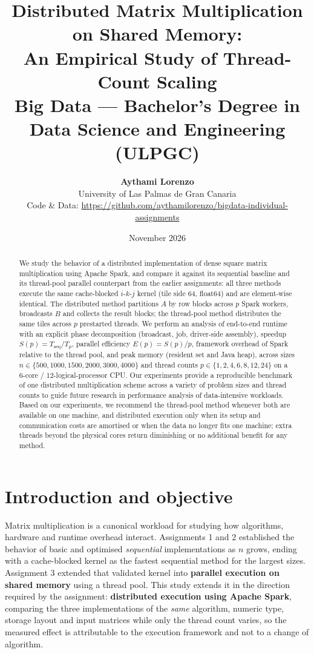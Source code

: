 \documentclass[11pt,a4paper]{article}
\title{\textbf{Distributed Matrix Multiplication on Shared Memory:\\
An Empirical Study of Thread-Count Scaling}\\
\vspace{0.2cm}
\Large Big Data --- Bachelor's Degree in Data Science and Engineering (ULPGC)}
\author{\textbf{Aythami Lorenzo} \\[0.1cm]
\small University of Las Palmas de Gran Canaria \\
\small Code \& Data: \url{https://github.com/aythamilorenzo/bigdata-individual-assignments}}
\date{November 2026}
\begin{document}
\maketitle

\begin{abstract}
{\small
We study the behavior of a distributed implementation of dense square matrix
multiplication using Apache Spark, and compare it against its sequential
baseline and its thread-pool parallel counterpart from the earlier
assignments: all three methods execute the same cache-blocked $i$-$k$-$j$
kernel (tile side 64, float64) and are element-wise identical. The
distributed method partitions $A$ by row blocks across $p$ Spark workers,
broadcasts $B$ and collects the result blocks; the thread-pool method
distributes the same tiles across $p$ prestarted threads. We perform an
analysis of end-to-end runtime with an explicit phase decomposition
(broadcast, job, driver-side assembly), speedup $S(p) = T_{\mathrm{seq}}/T_p$,
parallel efficiency $E(p) = S(p)/p$, framework overhead of Spark relative to
the thread pool, and peak memory (resident set and Java heap), across sizes
$n \in \{500, 1000, 1500, 2000, 3000, 4000\}$ and thread counts
$p \in \{1, 2, 4, 6, 8, 12, 24\}$ on a 6-core / 12-logical-processor CPU.
Our experiments provide a reproducible benchmark of one distributed
multiplication scheme across a variety of problem sizes and thread counts to
guide future research in performance analysis of data-intensive workloads.
Based on our experiments, we recommend the thread-pool method whenever both
are available on one machine, and distributed execution only when its
setup and communication costs are amortised or when the data no longer fits
one machine; extra threads beyond the physical cores return diminishing or
no additional benefit for any method.
}
\end{abstract}

\setcounter{tocdepth}{1}
{\small\tableofcontents}
\newpage

\section{Introduction and objective}
\label{sec:introduction}

Matrix multiplication is a canonical workload for studying how algorithms,
hardware and runtime overhead interact. Assignments 1 and 2 established the
behavior of basic and optimised \emph{sequential} implementations as $n$
grows, ending with a cache-blocked kernel as the fastest sequential method
for the largest sizes. Assignment 3 extended that validated kernel into
\textbf{parallel execution on shared memory} using a thread pool. This study
extends it in the direction required by the assignment:
\textbf{distributed execution using Apache Spark}, comparing the three
implementations of the \emph{same} algorithm, numeric type, storage layout
and input matrices while only the thread count varies, so the measured
effect is attributable to the execution framework and not to a change of
algorithm.
\end{document}

